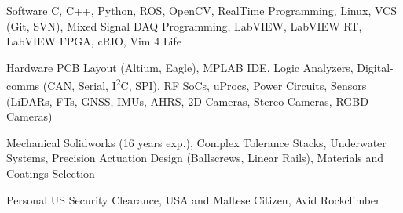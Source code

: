 
\begin{cvskills}

  \cvskill%
      {Software}
      {
            C, 
            C++, 
            Python, 
            ROS, 
            OpenCV, 
            RealTime Programming, 
            Linux, 
            VCS (Git, SVN), 
            Mixed Signal DAQ Programming, 
            LabVIEW, 
            LabVIEW RT, 
            LabVIEW FPGA, 
            cRIO, 
            Vim 4 Life
        }

  \cvskill%
      {Hardware} 
      {
            PCB Layout (Altium, Eagle),
            MPLAB IDE, 
            Logic Analyzers, 
            Digital-comms (CAN, Serial, I\textsuperscript{2}C, SPI),
            RF SoCs,
            uProcs,
            Power Circuits,
            Sensors (LiDARs,
            FTs,
            GNSS,
            IMUs,
            AHRS,
            2D Cameras,
            Stereo Cameras, 
            RGBD Cameras)
      }

  \cvskill%
      {Mechanical}
      {
            Solidworks (16 years exp.),
            Complex Tolerance Stacks,
            Underwater Systems,
            Precision Actuation Design (Ballscrews, Linear Rails), 
            Materials and Coatings Selection
      }

  \cvskill%
      {Personal}
      {
            US Security Clearance, 
            USA and Maltese Citizen, 
            Avid Rockclimber
      }

\end{cvskills}
